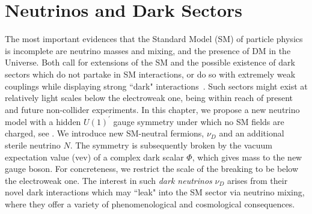 \graphicspath{{}{dark_nus/}{Diagrams/}}

\section{Neutrinos and Dark Sectors}

The most important evidences that the Standard Model (SM) of particle physics is incomplete are neutrino masses and mixing, and the presence of DM in the Universe. Both call for extensions of the SM and the possible existence of dark sectors which do not partake in SM interactions, or do so with extremely weak couplings while displaying strong ``dark" interactions~\cite{Boehm:2003hm,Boehm:2003ha,Alexander:2016aln}. Such sectors might exist at relatively light scales below the electroweak one, being within reach of present and future non-collider experiments. In this chapter, we propose a new neutrino model with a hidden $U(1)^\prime$ gauge symmetry under which no SM fields are charged, see  . We introduce new SM-neutral fermions, $\nu_D$ and an additional sterile neutrino $N$. The symmetry is subsequently broken by the vacuum expectation value (vev) of a complex dark scalar $\Phi$, which gives mass to the new gauge boson. For concreteness, we restrict the scale of the breaking to be below the electroweak one. The interest in such \textit{dark neutrinos} $\nu_D$ arises from their novel dark interactions which may ``leak" into the SM sector via neutrino mixing, where they offer a variety of phenomenological and cosmological consequences. 

